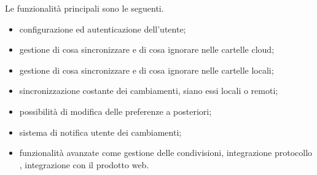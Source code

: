 Le funzionalità principali sono le seguenti.
\begin{itemize}
    \item configurazione ed autenticazione dell’utente;
    \item gestione di cosa sincronizzare e di cosa ignorare nelle cartelle cloud;
    \item gestione di cosa sincronizzare e di cosa ignorare nelle cartelle locali;
    \item sincronizzazione costante dei cambiamenti, siano essi locali o remoti;
    \item possibilità di modifica delle preferenze a posteriori;
    \item sistema di notifica utente dei cambiamenti;
    \item funzionalità avanzate come gestione delle condivisioni, integrazione protocollo ,
    integrazione con il prodotto web.
\end{itemize}